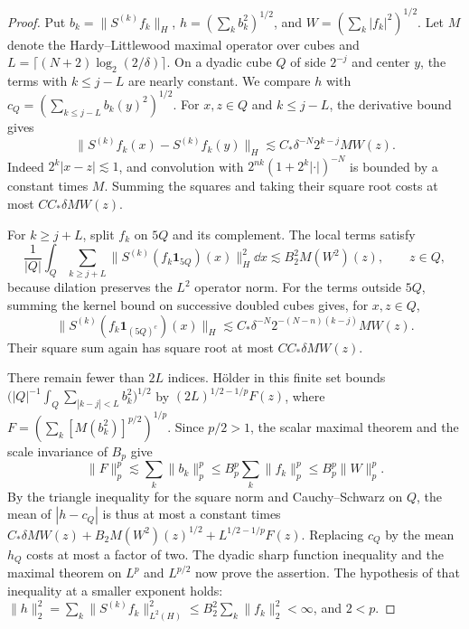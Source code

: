 \begin{proof}
Put \(b_k=\|S^{(k)}f_k\|_H\),
\(h=(\sum_k b_k^2)^{1/2}\), and \(W=(\sum_k|f_k|^2)^{1/2}\).
Let \(M\) denote the Hardy--Littlewood maximal operator over cubes and
\(L=\lceil(N+2)\log_2(2/\delta)\rceil\).
On a dyadic cube \(Q\) of side \(2^{-j}\) and center \(y\), the
terms with \(k\le j-L\) are nearly constant. We compare \(h\)
with \(c_Q=(\sum_{k\le j-L}b_k(y)^2)^{1/2}\).
For \(x,z\in Q\) and \(k\le j-L\), the derivative bound gives
\[
 \|S^{(k)}f_k(x)-S^{(k)}f_k(y)\|_H
       \lesssim C_*\delta^{-N} 2^{k-j}MW(z).
\]
Indeed \(2^k|x-z|\lesssim1\), and convolution with
\(2^{nk}(1+2^k|\cdot|)^{-N}\) is bounded by a constant times \(M\).
Summing the squares and taking their square root costs at most
\(C C_*\delta MW(z)\).

For \(k\ge j+L\), split \(f_k\) on \(5Q\) and its complement. The
local terms satisfy
\[
 \frac1{|Q|}\int_Q\sum_{k\ge j+L}
       \|S^{(k)}(f_k\mathbf1_{5Q})(x)\|_H^2\dd x
       \lesssim B_2^2 M(W^2)(z),\qquad z\in Q,
\]
because dilation preserves the \(L^2\) operator norm. For the terms
outside \(5Q\), summing the kernel bound on successive doubled cubes
gives, for \(x,z\in Q\),
\[
 \|S^{(k)}(f_k\mathbf1_{(5Q)^c})(x)\|_H
       \lesssim C_*\delta^{-N}2^{-(N-n)(k-j)}MW(z).
\]
Their square sum again has square root at most \(C C_*\delta MW(z)\).

There remain fewer than \(2L\) indices. H\"older in this finite set
bounds \(\bigl(|Q|^{-1}\int_Q\sum_{|k-j|<L} b_k^2\bigr)^{1/2}\) by
\((2L)^{1/2-1/p}F(z)\), where
\(F=(\sum_k [M(b_k^2)]^{p/2})^{1/p}\). Since \(p/2>1\), the scalar
maximal theorem and the scale invariance of \(B_p\) give
\[
 \|F\|_p^p\lesssim\sum_k\|b_k\|_p^p
       \le B_p^p\sum_k\|f_k\|_p^p\le B_p^p\|W\|_p^p.
\]
By the triangle inequality for the square norm and Cauchy--Schwarz on
\(Q\), the mean of \(|h-c_Q|\) is thus at most a constant times
\(
 C_*\delta MW(z)+B_2 M(W^2)(z)^{1/2}+L^{1/2-1/p}F(z).
\)
Replacing \(c_Q\) by the mean \(h_Q\) costs at most a factor of two.
The dyadic sharp function inequality
\cite[Chapter~IV, \S3.6, Corollary~1]{Stein1993}
and the maximal theorem on \(L^p\) and \(L^{p/2}\) now prove the
assertion. The hypothesis of that inequality at a smaller exponent holds:
$\|h\|_2^2=\sum_k\|S^{(k)}f_k\|_{L^2(H)}^2
\le B_2^2\sum_k\|f_k\|_2^2<\infty$, and $2<p$.
\end{proof}

